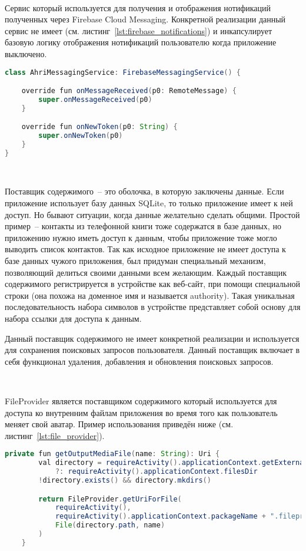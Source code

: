 ~\par

Сервис который используется для получения и отображения нотификаций полученных через Firebase Cloud Messaging. Конкретной реализации данный сервис не имеет (см. листинг~\ref{lst:firebase_notifications}) и инкапсулирует базовую логику отображения нотификаций пользователю когда приложение выключено.

\begin{lstlisting}[language=Java,label={lst:firebase_notifications},caption={AhriMessagingService}]
class AhriMessagingService: FirebaseMessagingService() {

    override fun onMessageReceived(p0: RemoteMessage) {
        super.onMessageReceived(p0)
    }

    override fun onNewToken(p0: String) {
        super.onNewToken(p0)
    }
}
\end{lstlisting}

~\par
Поставщик содержимого~-- это оболочка, в которую заключены данные. Если приложение использует базу данных SQLite, то только приложение имеет к ней доступ. Но бывают ситуации, когда данные желательно сделать общими. Простой пример~-- контакты из телефонной книги тоже содержатся в базе данных, но приложению нужно иметь доступ к данным, чтобы приложение тоже могло выводить список контактов. Так как исходное приложение не имеет доступа к базе данных чужого приложения, был придуман специальный механизм, позволяющий делиться своими данными всем желающим. Каждый поставщик содержимого регистрируется в устройстве как веб-сайт, при помощи специальной строки (она похожа на доменное имя и называется authority). Такая уникальная последовательность набора символов в устройстве представляет собой основу для набора ссылки для доступа к данным.

Данный поставщик содержимого не имеет конкретной реализации и используется для сохранения поисковых запросов пользователя. Данный поставщик включает в себя функционал удаления, добавления и обновления поисковых запросов.

~\par
FileProvider является поставщиком содержимого который используется для доступа ко внутренним файлам приложения во время того как пользователь меняет свой аватар. Пример использования приведён ниже (см. листинг~\ref{lst:file_provider}).

\begin{lstlisting}[language=Java,label={lst:file_provider},caption={Использование FileProvider}]
    private fun getOutputMediaFile(name: String): Uri {
        val directory = requireActivity().applicationContext.getExternalFilesDir(null)
            ?: requireActivity().applicationContext.filesDir
        !directory.exists() && directory.mkdirs()

        return FileProvider.getUriForFile(
            requireActivity(),
            requireActivity().applicationContext.packageName + ".fileprovider",
            File(directory.path, name)
        )
    }
\end{lstlisting}

